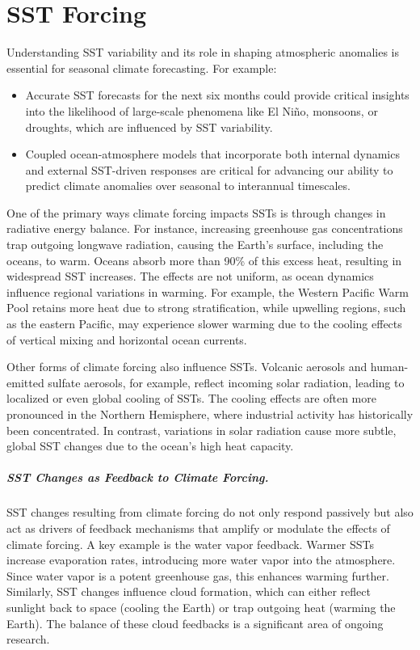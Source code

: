 
\chapter{SST Forcing}

Understanding SST variability and its role in shaping atmospheric anomalies is essential for seasonal climate forecasting. For example:
\begin{itemize}
	\item Accurate SST forecasts for the next six months could provide critical insights into the likelihood of large-scale phenomena like El Niño, monsoons, or droughts, which are influenced by SST variability.
	\item Coupled ocean-atmosphere models that incorporate both internal dynamics and external SST-driven responses are critical for advancing our ability to predict climate anomalies over seasonal to interannual timescales.
\end{itemize}


One of the primary ways climate forcing impacts SSTs is through changes in radiative energy balance. For instance, increasing greenhouse gas concentrations trap outgoing longwave radiation, causing the Earth’s surface, including the oceans, to warm. Oceans absorb more than 90\% of this excess heat, resulting in widespread SST increases. The effects are not uniform, as ocean dynamics influence regional variations in warming. For example, the Western Pacific Warm Pool retains more heat due to strong stratification, while upwelling regions, such as the eastern Pacific, may experience slower warming due to the cooling effects of vertical mixing and horizontal ocean currents.

Other forms of climate forcing also influence SSTs. Volcanic aerosols and human-emitted sulfate aerosols, for example, reflect incoming solar radiation, leading to localized or even global cooling of SSTs. The cooling effects are often more pronounced in the Northern Hemisphere, where industrial activity has historically been concentrated. In contrast, variations in solar radiation cause more subtle, global SST changes due to the ocean’s high heat capacity.

\paragraph{SST Changes as Feedback to Climate Forcing.}
SST changes resulting from climate forcing do not only respond passively but also act as drivers of feedback mechanisms that amplify or modulate the effects of climate forcing. A key example is the water vapor feedback. Warmer SSTs increase evaporation rates, introducing more water vapor into the atmosphere. Since water vapor is a potent greenhouse gas, this enhances warming further. Similarly, SST changes influence cloud formation, which can either reflect sunlight back to space (cooling the Earth) or trap outgoing heat (warming the Earth). The balance of these cloud feedbacks is a significant area of ongoing research.


